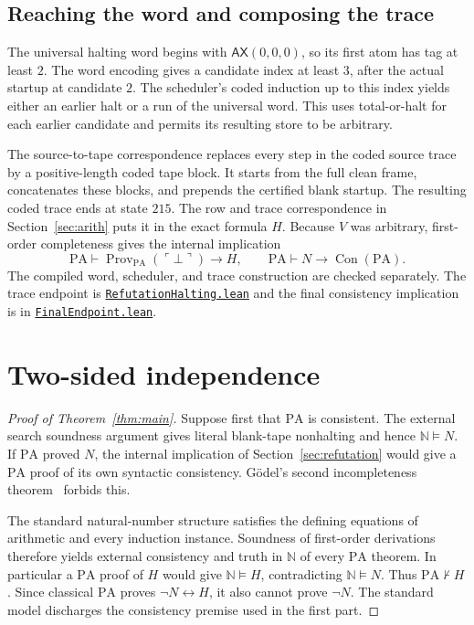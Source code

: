 \documentclass[11pt,letterpaper]{article}
\newcommand{\PA}{\mathrm{PA}}
\newcommand{\N}{\mathbb{N}}
\newcommand{\Con}{\operatorname{Con}}
\newcommand{\Prov}{\operatorname{Prov}}
\newcommand{\ax}{\mathsf{AX}}
\newcommand{\src}[2]{\href{https://github.com/jamesyc/BusyBeaver/blob/main/#1}{\texttt{\nolinkurl{#2}}}}
\begin{document}
\subsection{Reaching the word and composing the trace}

The universal halting word begins with $\ax(0,0,0)$, so its first
atom has tag at least $2$. The word encoding gives a candidate index
at least $3$, after the actual startup at candidate $2$. The
scheduler's coded induction up to this index yields either an
earlier halt or a run of the universal word. This uses total-or-halt
for each earlier candidate and permits its resulting store to be
arbitrary.

The source-to-tape correspondence replaces every step in the coded
source trace by a positive-length coded tape block. It starts from
the full clean frame, concatenates these blocks, and prepends the
certified blank startup. The resulting coded trace ends at state
$215$. The row and trace correspondence in Section~\ref{sec:arith}
puts it in the exact formula $H$. Because $V$ was arbitrary,
first-order completeness gives the internal implication
\[
          \PA\vdash \Prov_{\PA}(\ulcorner\bot\urcorner)\to H,
          \qquad
          \PA\vdash N\to\Con(\PA).
\]
The compiled word, scheduler, and trace construction are checked
separately. The trace endpoint is
\src{M6PA/RefutationHalting.lean}{RefutationHalting.lean} and the final
consistency implication is in \src{M6PA/FinalEndpoint.lean}{FinalEndpoint.lean}.

\section{Two-sided independence}\label{sec:independence}

\begin{proof}[Proof of Theorem~\ref{thm:main}]
Suppose first that $\PA$ is consistent. The external search soundness
argument gives literal blank-tape nonhalting and hence $\N\models N$.
If $\PA$ proved $N$, the internal implication of
Section~\ref{sec:refutation} would give a $\PA$ proof of its own
syntactic consistency. G\"odel's second incompleteness
theorem~\cite{goedel} forbids this.

The standard natural-number structure satisfies the defining
equations of arithmetic and every induction instance. Soundness of
first-order derivations therefore yields external consistency and
truth in $\N$ of every $\PA$ theorem. In particular a $\PA$ proof of
$H$ would give $\N\models H$, contradicting $\N\models N$.
Thus $\PA\nvdash H$. Since classical $\PA$ proves $\neg N
\leftrightarrow H$, it also cannot prove $\neg N$. The standard model
discharges the consistency premise used in the first part.
\end{proof}
\end{document}
